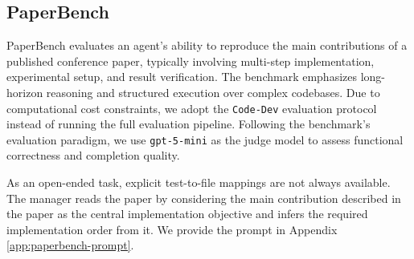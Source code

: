 \subsection{PaperBench}
\label{sec:paperbench}
PaperBench \cite{starace2025paperbench} evaluates an agent's ability to reproduce the main contributions of a published conference paper, typically involving multi-step implementation, experimental setup, and result verification. The benchmark emphasizes long-horizon reasoning and structured execution over complex codebases. Due to computational cost constraints, we adopt the \texttt{Code-Dev} evaluation protocol instead of running the full evaluation pipeline. Following the benchmark’s evaluation paradigm, we use \texttt{gpt-5-mini} \citep{openai2025gpt5mini} as the judge model to assess functional correctness and completion quality.

As an open-ended task, explicit test-to-file mappings are not always available. The manager reads the paper by considering the main contribution described in the paper as the central implementation objective and infers the required implementation order from it. We provide the prompt in Appendix \ref{app:paperbench-prompt}.



